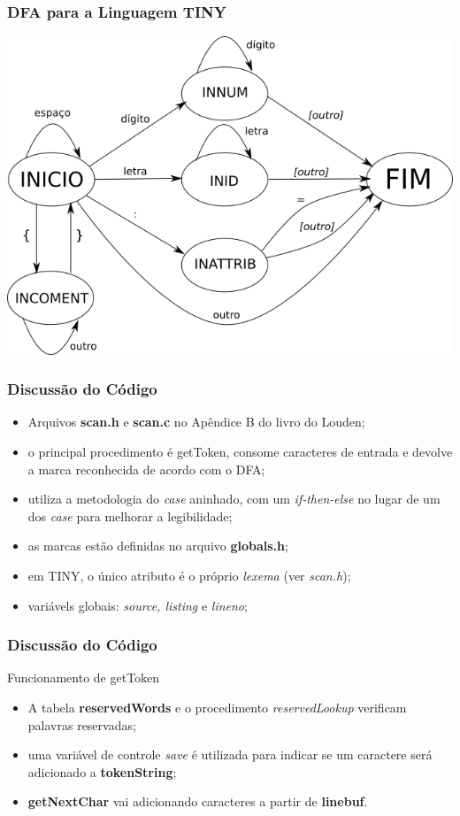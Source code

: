 \documentclass[table]{beamer}
\begin{document}
\begin{frame}
   \frametitle{DFA para a Linguagem TINY}
   \includegraphics[width=\linewidth,height=\textheight,keepaspectratio]{figuras/tinydfa.png}
\end{frame}

\begin{frame}
   \frametitle{Discussão do Código}
   \begin{itemize}
      \item Arquivos \textbf{scan.h} e \textbf{scan.c} no Apêndice B do livro do Louden;
      \item o principal procedimento é \textsf{getToken}, consome caracteres de entrada e devolve a marca reconhecida de acordo com o DFA;
      \item utiliza a metodologia do \textit{case} aninhado, com um \textit{if-then-else} no lugar de um dos \textit{case} para melhorar a legibilidade;
      \item as marcas estão definidas no arquivo \textbf{globals.h};
      \item em TINY, o único atributo é o próprio \textit{lexema} (ver \textit{scan.h});
      \item variávels globais: \textit{source, listing} e \textit{lineno};
   \end{itemize}
\end{frame}

\begin{frame}
   \frametitle{Discussão do Código}
   \begin{block}{Funcionamento de getToken}
      \begin{itemize}
         \item A tabela \textbf{reservedWords} e o procedimento \textit{reservedLookup} verificam palavras reservadas;
	 \item uma variável de controle \textit{save} é utilizada para indicar se um caractere será adicionado a \textbf{tokenString};
	 \item \textbf{getNextChar} vai adicionando caracteres a partir de \textbf{linebuf}.
      \end{itemize}
   \end{block}
\end{frame}
\end{document}
